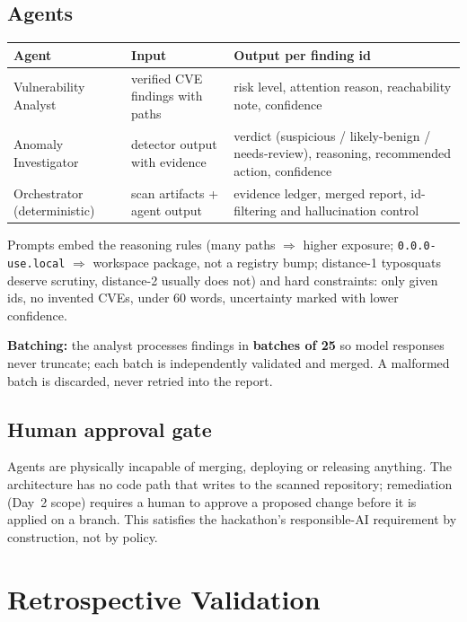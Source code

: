 \documentclass[11pt,a4paper]{article}
\begin{document}
\subsection{Agents}

\begin{center}
\small
\begin{tabular}{@{}p{3.4cm}p{4.2cm}p{5.6cm}@{}}
\toprule
\textbf{Agent} & \textbf{Input} & \textbf{Output per finding id} \\
\midrule
Vulnerability Analyst & verified CVE findings with paths & risk level, attention reason,
reachability note, confidence \\[3pt]
Anomaly Investigator & detector output with evidence & verdict (suspicious /
likely-benign / needs-review), reasoning, recommended action, confidence \\[3pt]
Orchestrator (deterministic) & scan artifacts + agent output & evidence ledger, merged
report, id-filtering and hallucination control \\
\bottomrule
\end{tabular}
\end{center}

Prompts embed the reasoning rules (many paths $\Rightarrow$ higher exposure;
\texttt{0.0.0-use.local} $\Rightarrow$ workspace package, not a registry bump;
distance-1 typosquats deserve scrutiny, distance-2 usually does not) and hard
constraints: only given ids, no invented CVEs, under 60 words, uncertainty marked with
lower confidence.

\textbf{Batching:} the analyst processes findings in \textbf{batches of 25} so model
responses never truncate; each batch is independently validated and merged. A malformed
batch is discarded, never retried into the report.

\subsection{Human approval gate}

Agents are physically incapable of merging, deploying or releasing anything. The
architecture has no code path that writes to the scanned repository; remediation
(Day~2 scope) requires a human to approve a proposed change before it is applied on a
branch. This satisfies the hackathon's responsible-AI requirement by construction, not
by policy.

\section{Retrospective Validation}
\label{sec:validation}
\end{document}
